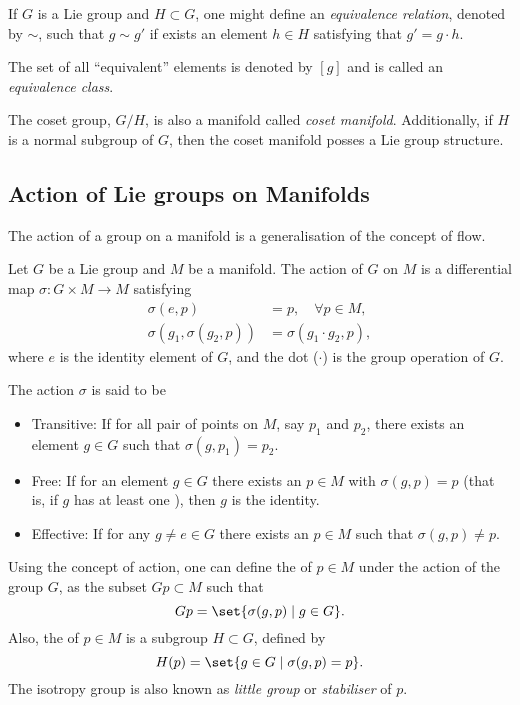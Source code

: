 If $G$ is a Lie group and $H \subset G$, one might define an \emph{equivalence relation}, denoted by $\sim$, such that $g \sim g'$ if exists an element $h \in H$ satisfying that $g' = g \cdot h$.

The set of all ``equivalent'' elements is denoted by $[g]$ and is called an \emph{equivalence class}.

The coset group, $G/H$, is also a manifold called \emph{coset manifold}. Additionally, if $H$ is a normal subgroup of $G$, then the coset manifold posses a Lie group structure.


\subsection{Action of Lie groups on Manifolds}

The action of a group on a manifold is a generalisation of the concept of flow.
\begin{Def}
  Let $G$ be a Lie group and $M$ be a manifold. The action of $G$ on $M$ is a differential map \mbox{$\sigma: G \times M \to M$} satisfying
  \begin{align}
    \sigma(e, p) &= p, \quad \forall p \in M ,\\
    \sigma(g_1, \sigma(g_2, p )) &= \sigma(g_1 \cdot g_2, p),
  \end{align}
  where $e$ is the identity element of $G$, and the dot ($\cdot$) is the group operation of $G$.
\end{Def}

The action $\sigma$ is said to be 
\begin{itemize}
\item Transitive: If for all pair of points on $M$, say $p_1$ and $p_2$, there exists an element $g \in G$ such that $\sigma(g, p_1) = p_2$.
\item Free: If for an element $g \in G$  there exists an $p \in M$ with $\sigma(g, p) = p$ (that is, if $g$ has at least one ), then $g$ is the identity.
\item Effective: If for any $g \neq e \in G$ there exists an $p \in M$ such that $\sigma(g, p) \neq p$.
\end{itemize}

Using the concept of action, one can define the \emph{} of $p \in M$ under the action of the group $G$, as the subset  $Gp \subset M$ such that
\begin{equation}
  Gp = \set{\sigma(g, p) \mid g \in G}.
\end{equation}
Also, the  of $p \in M$ is a subgroup $H \subset G$, defined by
\begin{equation}
  H(p) = \set{g \in G \mid \sigma(g, p) = p}.
\end{equation}
The isotropy group is also known as \emph{little group} or \emph{stabiliser} of $p$.

